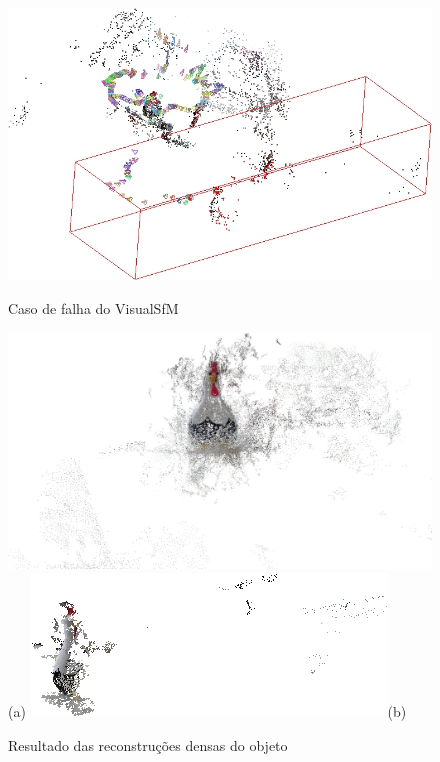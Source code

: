 \begin{figure}[!htpb]
	\centering
	\caption{Caso de falha do VisualSfM}
	\includegraphics[width=0.9\linewidth]{figs/perto_longe_esparsa_2.jpg}
	\label{fig:reconstrucaoEsparsaVisualSFM224:2}
\end{figure}

\begin{figure}[!h]
	\centering
	\caption{Resultado das reconstruções densas do objeto}
	{\label{fig:reconstrucaoDensaVisualSFM2241}\includegraphics[width=\linewidth]{figs/galinhadense224.jpg}}(a)
	{\label{fig:reconstrucaoDensaVisualSFM2242}\includegraphics[width=\linewidth]{figs/galinhavisualsfm224.jpg}}(b)
\end{figure}

